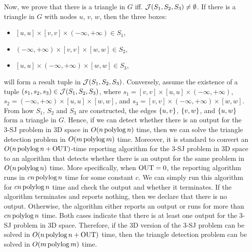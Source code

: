 Now, we prove that there is a triangle in $G$ iff.
 $\mathcal{J}(S_1,S_2,S_3) \neq \emptyset$. If there is a triangle in $G$ with nodes $u$, $v$, $w$, then the three boxes:
\begin{itemize}
    \item $[u,u]\times [v,v]\times(-\infty,+\infty)\in S_1$,
    \item $(-\infty,+\infty)\times[v,v]\times [w,w] \in S_2$,
    \item $[u,u]\times(-\infty,+\infty)\times [w,w] \in S_3$,
\end{itemize}
will form a result tuple in $\mathcal{J}(S_1,S_2,S_3)$. Conversely, assume the existence of a tuple $(s_1,s_2,s_3)\in \mathcal{J}(S_1,S_2,S_3)$, where $s_1 = [v,v]\times [u,u]\times(-\infty,+\infty)$, $s_2 = (-\infty,+\infty)\times[u,u]\times [w,w]$, and $s_3 = [v,v]\times(-\infty,+\infty)\times [w,w]$. From how $S_1$, $S_2$ and $S_3$ are constructed, the edges $\{u,v\}$, $\{v,w\}$, and $\{u,w\}$ form a triangle in $G$. Hence, if we can detect whether there is an output for the 3-SJ problem in 3D space in $O(n\operatorname*{polylog} n)$ time, then we can solve the triangle detection problem 
in $O(m \operatorname*{polylog} m)$ time. Moreover, it is standard to convert an $O(n \operatorname*{polylog} n + \mathrm{OUT})$-time reporting algorithm for the 3-SJ problem in 3D space to an algorithm that detects whether there is an output for the same problem in $O(n \operatorname*{polylog} n)$ time. More specifically, when $\mathrm{OUT} = 0$, the reporting algorithm runs in $cn\operatorname*{polylog} n$ time for some constant $c$. We can simply run this algorithm for $cn\operatorname*{polylog} n$ time and check the output and whether it terminates. If the algorithm terminates and reports nothing, then we declare that there is no output. Otherwise, the algorithm either reports an output or runs for more than $cn\operatorname*{polylog} n$ time. Both cases indicate that there is at least one output for the 3-SJ problem in 3D space. Therefore, if the 3D version of the 3-SJ problem can be solved in $O(n\operatorname*{polylog} n + \mathrm{OUT})$ time, then the triangle detection problem can be solved in $O(m\operatorname*{polylog} m)$ time.